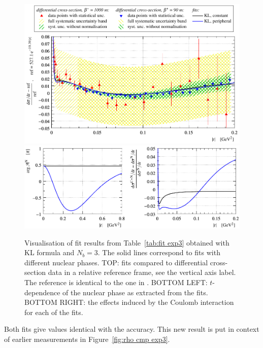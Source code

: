 \begin{figure}
\begin{center}
\includegraphics{fig/fit_exp3/t_dist_rel_with_fit.pdf}
\includegraphics{fig/fit_exp3/phase_cni_effect.pdf}
\caption{Visualisation of fit results from Table~\ref{tab:fit exp3} obtained with KL formula and $N_b=3$. The solid lines correspond to fits with different nuclear phases.
TOP: fits compared to differential cross-section data in a relative reference frame, see the vertical axis label. The reference is identical to the one in \cite{8tev-90m}. 
BOTTOM LEFT: $t$-dependence of the nuclear phase as extracted from the fits.
BOTTOM RIGHT: the effects induced by the Coulomb interaction for each of the fits.
}%
\label{fig:fit exp3}
\end{center}
\end{figure}

Both fits give values identical with the accuracy. This new result is put in context of earlier measurements in Figure~\ref{fig:rho cmp exp3}.

